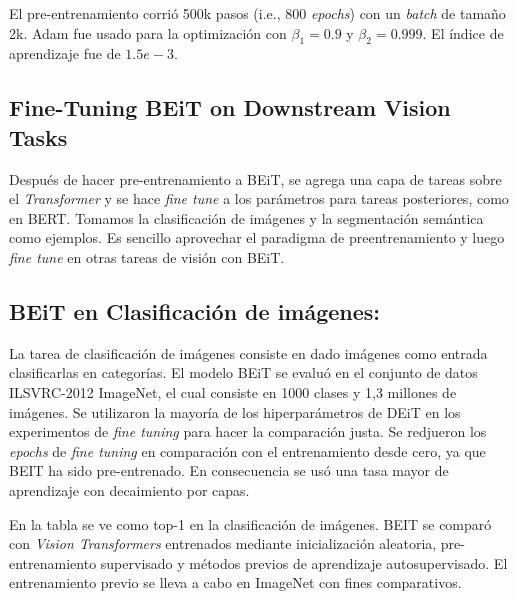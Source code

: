 El pre-entrenamiento corrió 500k pasos (i.e., 800 \textit{epochs}) con un \textit{batch} de tamaño 2k. Adam fue usado para la optimización con $\beta_{1} = 0.9$ y $\beta_{2} = 0.999$. El índice de aprendizaje fue de $1.5e-3$.

\subsection{Fine-Tuning BEiT on Downstream Vision Tasks}
Después de hacer pre-entrenamiento a BEiT, se agrega una capa de tareas sobre el \textit{Transformer} y se hace \textit{fine tune} a los parámetros para tareas posteriores, como en BERT. Tomamos la clasificación de imágenes y la segmentación semántica como ejemplos. Es sencillo aprovechar el paradigma de preentrenamiento y luego \textit{fine tune} en otras tareas de visión con BEiT.

\subsection{BEiT en Clasificación de imágenes:}

La tarea de clasificación de imágenes consiste en dado imágenes como entrada clasificarlas en categorías. El modelo BEiT se evaluó en el conjunto de datos ILSVRC-2012 ImageNet, el cual consiste en 1000 clases y 1,3 millones de imágenes. Se utilizaron la mayoría de los hiperparámetros de DEiT en los experimentos de \textit{fine tuning} para hacer la comparación justa. Se redjueron los \textit{epochs} de \textit{fine tuning} en comparación con el entrenamiento desde cero, ya que BEIT ha sido pre-entrenado. En consecuencia se usó una tasa mayor de aprendizaje con decaimiento por capas.

En la tabla se ve como top-1 en la clasificación de imágenes. BEIT se comparó con \textit{Vision Transformers} entrenados mediante inicialización aleatoria, pre-entrenamiento supervisado y métodos previos de aprendizaje autosupervisado. El entrenamiento previo se lleva a cabo en ImageNet con fines comparativos.

